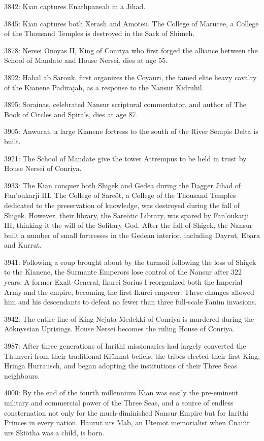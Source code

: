 \documentclass[]{book}
\begin{document}
3842: Kian captures Enathpaneah in a Jihad.

3845: Kian captures both Xerash and Amoteu. The College of Marucee, a College of
the Thousand Temples is destroyed in the Sack of Shimeh.

3878: Nersei Onoyas II, King of Conriya who first forged the alliance between the
School of Mandate and House Nersei, dies at age 55.

3892: Habal ab Sarouk, first organizes the Coyauri, the famed elite heavy cavalry of
the Kianene Padirajah, as a response to the Nansur Kidruhil.

3895: Sorainas, celebrated Nansur scriptural commentator, and author of The Book
of Circles and Spirals, dies at age 87.

3905: Anwurat, a large Kianene fortress to the south of the River Sempis Delta is
built.

3921: The School of Mandate give the tower Attrempus to be held in trust by House
Nersei of Conriya.

3933: The Kian conquer both Shigek and Gedea during the Dagger Jihad of Fan'oukarji III. The College of Sareöt, a College of the Thousand Temples dedicated to the preservation of knowledge, was destroyed during the fall of Shigek. However, their library, the Sareötic Library, was spared by Fan'oukarji III, thinking it the will of the Solitary God. After the fall of Shigek, the Nansur built a number of small fortresses in the Gedean interior,
including Dayrut, Ebara and Kurrut.

3941: Following a coup brought about by the turmoil following the loss of Shigek to
the Kianene, the Surmante Emperors lose control of the Nansur after 322 years.
A former Exalt-General, Ikurei Sorius I reorganized both the Imperial Army and
the empire, becoming the first Ikurei emperor. These changes allowed him and
his descendants to defeat no fewer than three full-scale Fanim invasions.

3942: The entire line of King Nejata Medekki of Conriya is murdered during the
Aöknyssian Uprisings. House Nersei becomes the ruling House of Conriya.

3987: After three generations of Inrithi missionaries had largely converted the
Thunyeri from their traditional Kiünnat beliefs, the tribes elected their first
King, Hringa Hurrausch, and began adopting the institutions of their Three
Seas neighbours.

4000: By the end of the fourth millennium Kian was easily the pre-eminent military
and commercial power of the Three Seas, and a source of endless consternation
not only for the much-diminished Nansur Empire but for Inrithi Princes in
every nation. Haurut urs Mab, an Utemot memorialist when Cnaiür urs
Skiötha was a child, is born.
\end{document}
